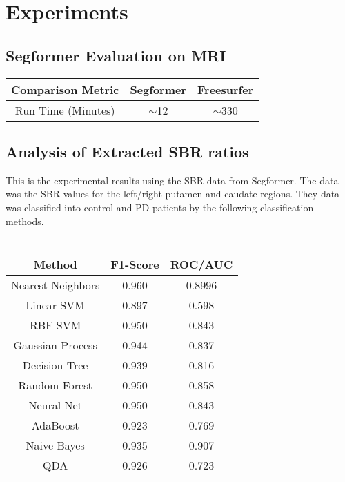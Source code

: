 \section{Experiments}
\subsection{Segformer Evaluation on MRI}
\begin{tabular}{c|c|c}
    Comparison Metric & Segformer  & Freesurfer \\
    \hline
    Run Time (Minutes) & $\sim$12 & $\sim$330 \\

\end{tabular}
\subsection{Analysis of Extracted SBR ratios}
This is the experimental results using the SBR data from Segformer. The data was the SBR values for the left/right putamen and caudate regions. They data was classified into control and PD patients by the following classification methods.\\
\\
\begin{tabular}{c|c|c}
    Method & F1-Score  & ROC/AUC \\
    \hline
    Nearest Neighbors & 0.960 & 0.8996 \\
    Linear SVM & 0.897 & 0.598 \\
    RBF SVM & 0.950 & 0.843 \\
    Gaussian Process & 0.944 & 0.837 \\
    Decision Tree & 0.939 & 0.816 \\
    Random Forest & 0.950 & 0.858 \\
    Neural Net & 0.950 & 0.843 \\
    AdaBoost & 0.923 & 0.769 \\
    Naive Bayes & 0.935 & 0.907 \\
    QDA & 0.926 & 0.723 \\
\end{tabular}


